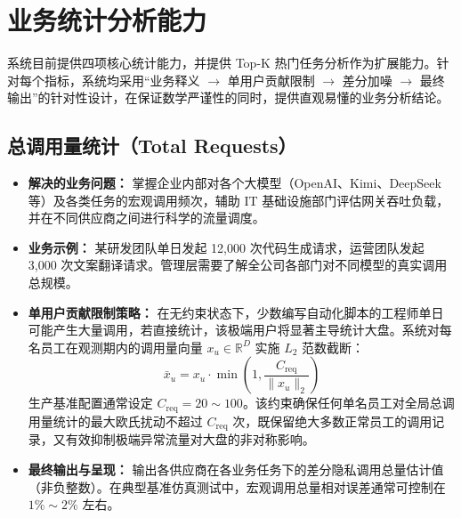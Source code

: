 \section{业务统计分析能力}
\label{sec:analytics_capabilities}

系统目前提供四项核心统计能力，并提供 Top-K 热门任务分析作为扩展能力。针对每个指标，系统均采用“业务释义 $\to$ 单用户贡献限制 $\to$ 差分加噪 $\to$ 最终输出”的针对性设计，在保证数学严谨性的同时，提供直观易懂的业务分析结论。

\subsection{总调用量统计（Total Requests）}
\begin{itemize}[leftmargin=2em]
  \item \textbf{解决的业务问题：} 掌握企业内部对各个大模型（OpenAI、Kimi、DeepSeek 等）及各类任务的宏观调用频次，辅助 IT 基础设施部门评估网关吞吐负载，并在不同供应商之间进行科学的流量调度。
  \item \textbf{业务示例：} 某研发团队单日发起 12,000 次代码生成请求，运营团队发起 3,000 次文案翻译请求。管理层需要了解全公司各部门对不同模型的真实调用总规模。
  \item \textbf{单用户贡献限制策略：} 在无约束状态下，少数编写自动化脚本的工程师单日可能产生大量调用，若直接统计，该极端用户将显著主导统计大盘。系统对每名员工在观测期内的调用量向量 $x_u \in \mathbb{R}^D$ 实施 $L_2$ 范数截断：
  \begin{equation}
    \bar{x}_u = x_u \cdot \min\left(1, \frac{C_{\text{req}}}{\|x_u\|_2}\right)
  \end{equation}
  生产基准配置通常设定 $C_{\text{req}} = 20 \sim 100$。该约束确保任何单名员工对全局总调用量统计的最大欧氏扰动不超过 $C_{\text{req}}$ 次，既保留绝大多数正常员工的调用记录，又有效抑制极端异常流量对大盘的非对称影响。
  \item \textbf{最终输出与呈现：} 输出各供应商在各业务任务下的差分隐私调用总量估计值（非负整数）。在典型基准仿真测试中，宏观调用总量相对误差通常可控制在 $1\% \sim 2\%$ 左右。
\end{itemize}

